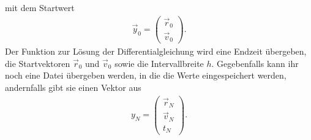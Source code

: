 mit dem Startwert
\begin{align}
	\vec{y}_0=
	\begin{pmatrix}
		\vec{r}_0\\\vec{v}_0
	\end{pmatrix}.
\end{align}
Der Funktion zur Lösung der Differentialgleichung wird eine Endzeit übergeben, die Startvektoren $\vec{r}_0$ und $\vec{v}_0$ sowie die Intervallbreite $h$. Gegebenfalls kann ihr noch eine Datei übergeben werden, in die die Werte eingespeichert werden, andernfalls gibt sie einen Vektor aus
\begin{align}
	y_N = 
	\begin{pmatrix}
		\vec{r}_N\\\vec{v}_N\\ t_N
	\end{pmatrix}.
\end{align}
